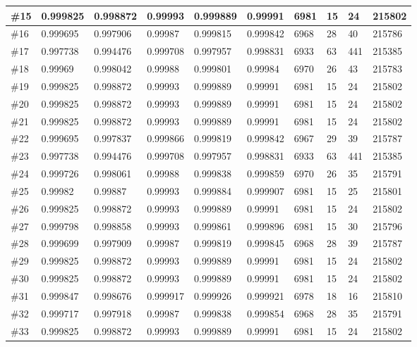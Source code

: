 \begin{longtable}{l|l|l|l|l|l|l|l|l|l}
\#15 & 0.999825 & 0.998872 & 0.99993  & 0.999889 & 0.99991  & 6981 & 15 & 24  & 215802 \\ \hline
\#16 & 0.999695 & 0.997906 & 0.99987  & 0.999815 & 0.999842 & 6968 & 28 & 40  & 215786 \\ \hline
\#17 & 0.997738 & 0.994476 & 0.999708 & 0.997957 & 0.998831 & 6933 & 63 & 441 & 215385 \\ \hline
\#18 & 0.99969  & 0.998042 & 0.99988  & 0.999801 & 0.99984  & 6970 & 26 & 43  & 215783 \\ \hline
\#19 & 0.999825 & 0.998872 & 0.99993  & 0.999889 & 0.99991  & 6981 & 15 & 24  & 215802 \\ \hline
\#20 & 0.999825 & 0.998872 & 0.99993  & 0.999889 & 0.99991  & 6981 & 15 & 24  & 215802 \\ \hline
\#21 & 0.999825 & 0.998872 & 0.99993  & 0.999889 & 0.99991  & 6981 & 15 & 24  & 215802 \\ \hline
\#22 & 0.999695 & 0.997837 & 0.999866 & 0.999819 & 0.999842 & 6967 & 29 & 39  & 215787 \\ \hline
\#23 & 0.997738 & 0.994476 & 0.999708 & 0.997957 & 0.998831 & 6933 & 63 & 441 & 215385 \\ \hline
\#24 & 0.999726 & 0.998061 & 0.99988  & 0.999838 & 0.999859 & 6970 & 26 & 35  & 215791 \\ \hline
\#25 & 0.99982  & 0.99887  & 0.99993  & 0.999884 & 0.999907 & 6981 & 15 & 25  & 215801 \\ \hline
\#26 & 0.999825 & 0.998872 & 0.99993  & 0.999889 & 0.99991  & 6981 & 15 & 24  & 215802 \\ \hline
\#27 & 0.999798 & 0.998858 & 0.99993  & 0.999861 & 0.999896 & 6981 & 15 & 30  & 215796 \\ \hline
\#28 & 0.999699 & 0.997909 & 0.99987  & 0.999819 & 0.999845 & 6968 & 28 & 39  & 215787 \\ \hline
\#29 & 0.999825 & 0.998872 & 0.99993  & 0.999889 & 0.99991  & 6981 & 15 & 24  & 215802 \\ \hline
\#30 & 0.999825 & 0.998872 & 0.99993  & 0.999889 & 0.99991  & 6981 & 15 & 24  & 215802 \\ \hline
\#31 & 0.999847 & 0.998676 & 0.999917 & 0.999926 & 0.999921 & 6978 & 18 & 16  & 215810 \\ \hline
\#32 & 0.999717 & 0.997918 & 0.99987  & 0.999838 & 0.999854 & 6968 & 28 & 35  & 215791 \\ \hline
\#33 & 0.999825 & 0.998872 & 0.99993  & 0.999889 & 0.99991  & 6981 & 15 & 24  & 215802 \\ \hline

\end{longtable}
